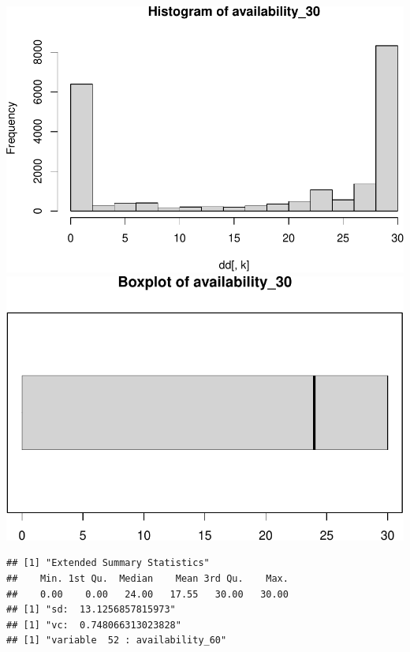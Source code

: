 \includegraphics{anal_files/figure-latex/unnamed-chunk-7-32.pdf}
\includegraphics{anal_files/figure-latex/unnamed-chunk-7-33.pdf}

\begin{verbatim}
## [1] "Extended Summary Statistics"
##    Min. 1st Qu.  Median    Mean 3rd Qu.    Max. 
##    0.00    0.00   24.00   17.55   30.00   30.00 
## [1] "sd:  13.1256857815973"
## [1] "vc:  0.748066313023828"
## [1] "variable  52 : availability_60"
\end{verbatim}

